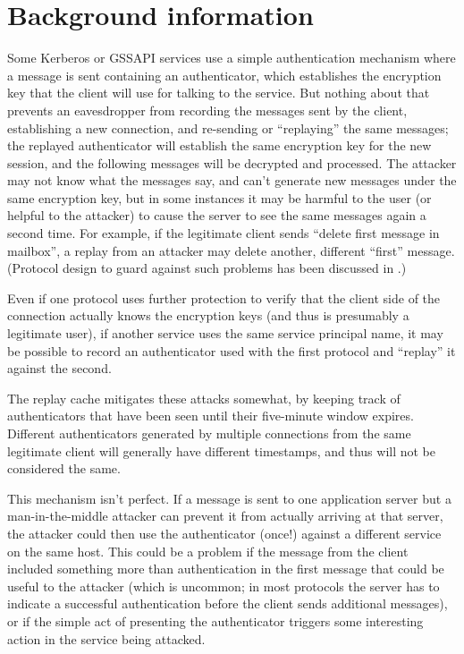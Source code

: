 \documentclass[letterpaper,10pt,english]{sphinxmanual}
\begin{document}
\section{Background information}
\label{\detokenize{basic/rcache_def:background-information}}
Some Kerberos or GSSAPI services use a simple authentication mechanism
where a message is sent containing an authenticator, which establishes
the encryption key that the client will use for talking to the
service.  But nothing about that prevents an eavesdropper from
recording the messages sent by the client, establishing a new
connection, and re-sending or “replaying” the same messages; the
replayed authenticator will establish the same encryption key for the
new session, and the following messages will be decrypted and
processed.  The attacker may not know what the messages say, and can’t
generate new messages under the same encryption key, but in some
instances it may be harmful to the user (or helpful to the attacker)
to cause the server to see the same messages again a second time.  For
example, if the legitimate client sends “delete first message in
mailbox”, a replay from an attacker may delete another, different
“first” message.  (Protocol design to guard against such problems has
been discussed in .)

Even if one protocol uses further protection to verify that the client
side of the connection actually knows the encryption keys (and thus is
presumably a legitimate user), if another service uses the same
service principal name, it may be possible to record an authenticator
used with the first protocol and “replay” it against the second.

The replay cache mitigates these attacks somewhat, by keeping track of
authenticators that have been seen until their five-minute window
expires.  Different authenticators generated by multiple connections
from the same legitimate client will generally have different
timestamps, and thus will not be considered the same.

This mechanism isn’t perfect.  If a message is sent to one application
server but a man-in-the-middle attacker can prevent it from actually
arriving at that server, the attacker could then use the authenticator
(once!) against a different service on the same host.  This could be a
problem if the message from the client included something more than
authentication in the first message that could be useful to the
attacker (which is uncommon; in most protocols the server has to
indicate a successful authentication before the client sends
additional messages), or if the simple act of presenting the
authenticator triggers some interesting action in the service being
attacked.
\end{document}
